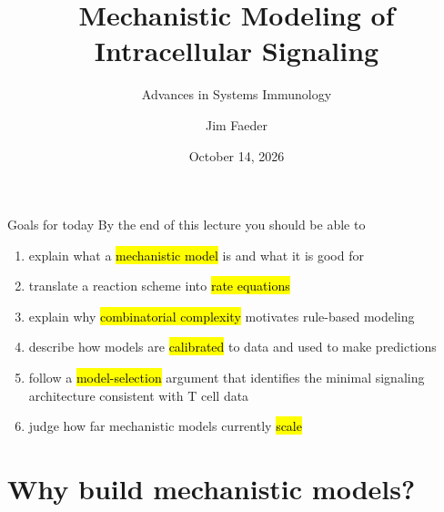 \documentclass[aspectratio=169,10pt,t]{beamer}
\title[Mechanistic Modeling of Intracellular Signaling]{Mechanistic Modeling of\\Intracellular Signaling}
\subtitle{Advances in Systems Immunology}
\author{Jim Faeder}
\institute{Department of Computational and Systems Biology\\University of Pittsburgh}
\date{October 14, 2026}
\newcommand{\lecturerepo}{https://github.com/jrfaeder/SystemsImmunology}
\begin{document}
\begin{frame}[plain]
  \titlepage
\end{frame}

\begin{frame}{Goals for today}
  By the end of this lecture you should be able to
  \begin{enumerate}[<+->]
    \setlength\itemsep{1.5mm}
    \item explain what a \hl{mechanistic model} is and what it is good for
    \item translate a reaction scheme into \hl{rate equations}
    \item explain why \hl{combinatorial complexity} motivates rule-based modeling
    \item describe how models are \hl{calibrated} to data and used to make predictions
    \item follow a \hl{model-selection} argument that identifies the minimal signaling
          architecture consistent with T cell data
    \item judge how far mechanistic models currently \hl{scale}
  \end{enumerate}
\end{frame}

\section{Why build mechanistic models?}
\end{document}
